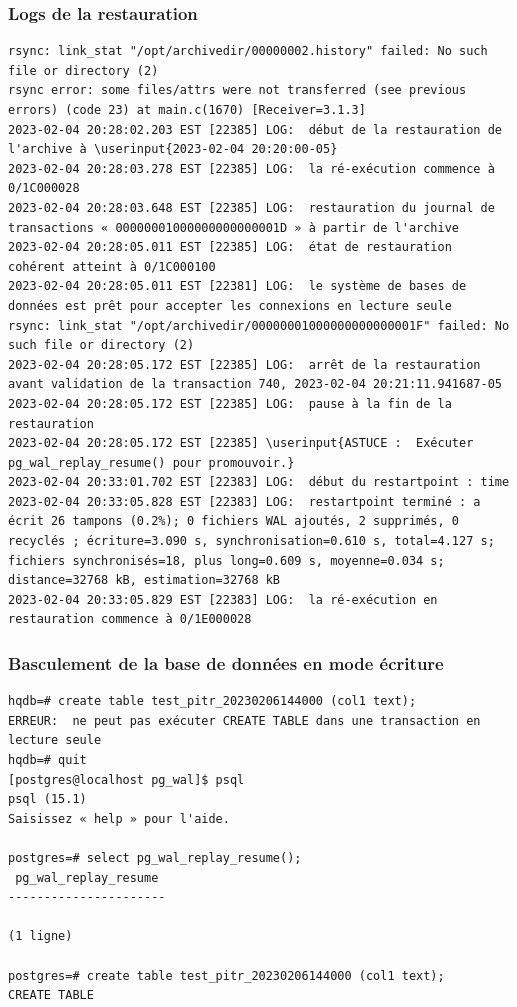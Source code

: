 \begin{frame}[fragile]\frametitle{Logs de la restauration}

\begin{tiny}
\begin{Verbatim}[commandchars=\\\{\}]
rsync: link_stat "/opt/archivedir/00000002.history" failed: No such file or directory (2)
rsync error: some files/attrs were not transferred (see previous errors) (code 23) at main.c(1670) [Receiver=3.1.3]
2023-02-04 20:28:02.203 EST [22385] LOG:  début de la restauration de l'archive à \userinput{2023-02-04 20:20:00-05}
2023-02-04 20:28:03.278 EST [22385] LOG:  la ré-exécution commence à 0/1C000028
2023-02-04 20:28:03.648 EST [22385] LOG:  restauration du journal de transactions « 00000001000000000000001D » à partir de l'archive
2023-02-04 20:28:05.011 EST [22385] LOG:  état de restauration cohérent atteint à 0/1C000100
2023-02-04 20:28:05.011 EST [22381] LOG:  le système de bases de données est prêt pour accepter les connexions en lecture seule
rsync: link_stat "/opt/archivedir/00000001000000000000001F" failed: No such file or directory (2)
2023-02-04 20:28:05.172 EST [22385] LOG:  arrêt de la restauration avant validation de la transaction 740, 2023-02-04 20:21:11.941687-05
2023-02-04 20:28:05.172 EST [22385] LOG:  pause à la fin de la restauration
2023-02-04 20:28:05.172 EST [22385] \userinput{ASTUCE :  Exécuter pg_wal_replay_resume() pour promouvoir.}
2023-02-04 20:33:01.702 EST [22383] LOG:  début du restartpoint : time
2023-02-04 20:33:05.828 EST [22383] LOG:  restartpoint terminé : a écrit 26 tampons (0.2%); 0 fichiers WAL ajoutés, 2 supprimés, 0 recyclés ; écriture=3.090 s, synchronisation=0.610 s, total=4.127 s; fichiers synchronisés=18, plus long=0.609 s, moyenne=0.034 s; distance=32768 kB, estimation=32768 kB
2023-02-04 20:33:05.829 EST [22383] LOG:  la ré-exécution en restauration commence à 0/1E000028
\end{Verbatim}
\end{tiny}

\end{frame}


\begin{frame}[fragile]\frametitle{Basculement de la base de données en mode écriture}

\begin{tiny}
\begin{verbatim}
hqdb=# create table test_pitr_20230206144000 (col1 text);
ERREUR:  ne peut pas exécuter CREATE TABLE dans une transaction en lecture seule
hqdb=# quit
[postgres@localhost pg_wal]$ psql
psql (15.1)
Saisissez « help » pour l'aide.

postgres=# select pg_wal_replay_resume();
 pg_wal_replay_resume 
----------------------
 
(1 ligne)

postgres=# create table test_pitr_20230206144000 (col1 text);
CREATE TABLE
\end{verbatim}
\end{tiny}

\end{frame}

